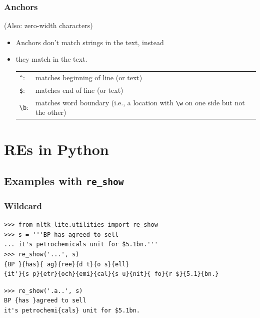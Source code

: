 \begin{frame}[fragile]
  \frametitle{Anchors}

(Also: zero-width characters)

\begin{itemize}[<+->]
  \item Anchors don't match strings in the text, instead
  \item they match  in the text.\\

 \begin{tabular}{lp{3in}}
\verb!^!: & matches beginning of line (or text)\\
\verb!$!: & matches end of line (or text) \\%
\verb!\b!: &  matches word boundary (i.e., a location with \verb!\w! on one side
but not the other)  \\
  \end{tabular}
\end{itemize}
 
\end{frame}

\section{REs in Python}

\subsection{Examples with \texttt{re\_show}}

\begin{frame}[fragile]
\frametitle{Wildcard}

\begin{verbatim}
>>> from nltk_lite.utilities import re_show
>>> s = '''BP has agreed to sell
... it's petrochemicals unit for $5.1bn.'''
>>> re_show('...', s)
{BP }{has}{ ag}{ree}{d t}{o s}{ell}
{it'}{s p}{etr}{och}{emi}{cal}{s u}{nit}{ fo}{r $}{5.1}{bn.}
\end{verbatim}

\begin{verbatim}
>>> re_show('.a..', s)
BP {has }agreed to sell
it's petrochemi{cals} unit for $5.1bn.
\end{verbatim}

\end{frame}




